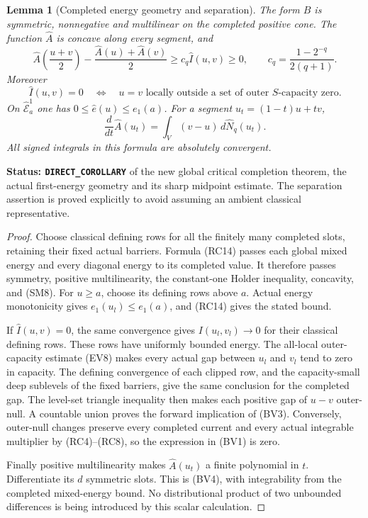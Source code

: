 \documentclass[11pt,a4paper]{article}
\numberwithin{equation}{section}
\newtheorem{lemma}[theorem]{Lemma}
\theoremstyle{definition}
\theoremstyle{remark}
\begin{document}
\begin{lemma}[Completed energy geometry and separation]
\label{lem:r11-completed-first-energy-geometry}
The form $\widehat B$ is symmetric, nonnegative and
multilinear on the completed positive cone.
The function $\widehat A$ is concave along every
segment, and
\[
 \widehat A\left(\frac{u+v}{2}\right)
      -\frac{\widehat A(u)+\widehat A(v)}2
                    \geq c_q\widehat I(u,v)\geq0,
 \qquad c_q=\frac{1-2^{-q}}{2(q+1)}.
 \tag{BV2}
\]
Moreover
\[
 \widehat I(u,v)=0
       \quad\Longleftrightarrow\quad
 u=v\text{ locally outside a set of outer }S
                         \text{-capacity zero}.
 \tag{BV3}
\]
On $\widehat{\mathcal E}^1_a$ one has
$0\leq\widehat e(u)\leq e_1(a)$.
For a segment $u_t=(1-t)u+tv$,
\[
             \frac{d}{dt}\widehat A(u_t)
                    =\int_V(v-u)\,d\widehat N_q(u_t).
 \tag{BV4}
\]
All signed integrals in this formula are absolutely
convergent.
\end{lemma}

\noindent\textbf{Status: \texttt{DIRECT\_COROLLARY}}
of the new global critical completion theorem,
the actual first-energy geometry and its sharp
midpoint estimate.  The separation assertion is
proved explicitly to avoid assuming an ambient
classical representative.

\begin{proof}
Choose classical defining rows for all the
finitely many completed slots, retaining their
fixed actual barriers.  Formula (RC14) passes
each global mixed energy and every diagonal
energy to its completed value.  It therefore
passes symmetry, positive multilinearity,
the constant-one Holder inequality, concavity,
and (SM8).  For $u\geq a$, choose its defining
rows above $a$.  Actual energy monotonicity
gives $e_1(u_l)\leq e_1(a)$, and (RC14)
gives the stated bound.

If $\widehat I(u,v)=0$, the same convergence
gives $I(u_l,v_l)\to0$ for their classical
defining rows.  These rows have uniformly
bounded energy.  The all-local outer-capacity
estimate (EV8) makes every actual gap between
$u_l$ and $v_l$ tend to zero in capacity.
The defining convergence of each clipped row,
and the capacity-small deep sublevels of the
fixed barriers, give the same conclusion for
the completed gap.  The level-set triangle
inequality then makes each positive gap of
$u-v$ outer-null.  A countable union proves
the forward implication of (BV3).
Conversely, outer-null changes preserve every
completed current and every actual integrable
multiplier by (RC4)--(RC8), so the expression
in (BV1) is zero.

Finally positive multilinearity makes
$\widehat A(u_t)$ a finite polynomial in $t$.
Differentiate its $d$ symmetric slots.
This is (BV4), with integrability from the
completed mixed-energy bound.  No distributional
product of two unbounded differences is being
introduced by this scalar calculation.
\end{proof}
\end{document}
